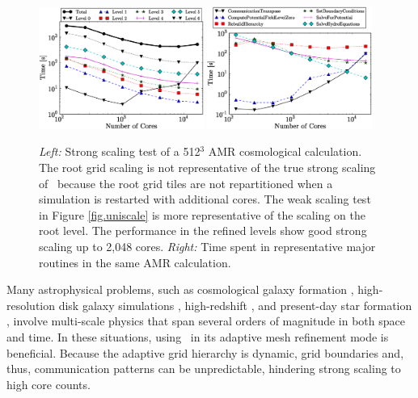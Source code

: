 \begin{figure}
\begin{center}
\includegraphics[width=0.48\textwidth]{figures/strong_scaling_levels.eps}
\hfill
\includegraphics[width=0.48\textwidth]{figures/strong_scaling_routines.eps}
\end{center}
\caption{\emph{Left:} Strong scaling test of a 512$^3$ AMR
cosmological calculation.  The root grid scaling is not representative
of the true strong scaling of \enzo\ because the root grid tiles are not
repartitioned when a simulation is restarted with additional cores.
The weak scaling test in Figure \ref{fig.uniscale} is more
representative of the scaling on the root level.  The performance in
the refined levels show good strong scaling up to 2,048 cores.
\emph{Right:} Time spent in representative major routines in the same
AMR calculation.}
\label{fig:strong_scaling}
\end{figure}

Many astrophysical problems, such as cosmological galaxy formation
\citep{2012ApJ...749..140H}, high-resolution disk galaxy simulations
\citep{2011ApJ...738...54K}, high-redshift \citep{2009Sci...325..601T}, and present-day
star formation \citep{Collins12a}, involve multi-scale physics that
span several orders of magnitude in both space and time.  In these
situations, using \enzo\ in its adaptive mesh refinement mode is
beneficial.  Because the adaptive grid hierarchy is dynamic, grid
boundaries and, thus, communication patterns can be unpredictable,
hindering strong scaling to high core counts.

